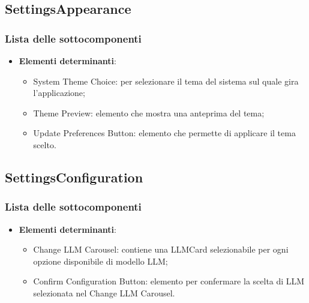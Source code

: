 \documentclass[10pt, a4paper]{article}
\begin{document}
\subsection{SettingsAppearance}
\subsubsection{Lista delle sottocomponenti}

\label{ThemeSelectionDettaglio}
\begin{itemize}
    \item \textbf{Elementi determinanti}:
     \begin{itemize}
        \item System Theme Choice: per selezionare il tema del sistema sul quale gira l'applicazione;       
        \item Theme Preview: elemento che mostra una anteprima del tema;
        \item Update Preferences Button: elemento che permette di applicare il tema scelto.
    \end{itemize}
\end{itemize}


\subsection{SettingsConfiguration}
\subsubsection{Lista delle sottocomponenti}

\label{ChangeLLMConfigurationDettaglio}
\begin{itemize}
    \item \textbf{Elementi determinanti}:
     \begin{itemize}
        \item Change LLM Carousel: contiene una LLMCard selezionabile per ogni opzione disponibile di modello LLM;
        \item Confirm Configuration Button: elemento per confermare la scelta di LLM selezionata nel Change LLM Carousel.
    \end{itemize}
\end{itemize}
\end{document}
